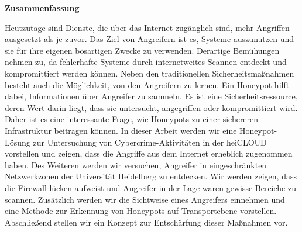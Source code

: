 \thispagestyle{empty}
\begin{center}
    \begin{minipage}[c][0.48\textheight][b]{0.9\textwidth}
        \small
        \begin{center}
            \textbf{Zusammenfassung}
        \end{center}\par
        \vspace{\baselineskip}
        Heutzutage sind Dienste, die über das Internet zugänglich sind, mehr Angriffen ausgesetzt als je zuvor.
        Das Ziel von Angreifern ist es, Systeme auszunutzen und sie für ihre eigenen bösartigen Zwecke zu verwenden.
        Derartige Bemühungen nehmen zu, da fehlerhafte Systeme durch internetweites Scannen entdeckt und kompromittiert werden können.
        Neben den traditionellen Sicherheitsmaßnahmen besteht auch die Möglichkeit, von den Angreifern zu lernen.
        Ein Honeypot hilft dabei, Informationen über Angreifer zu sammeln.
        Es ist eine Sicherheitsressource, deren Wert darin liegt, dass sie untersucht, angegriffen oder kompromittiert wird.
        Daher ist es eine interessante Frage, wie Honeypots zu einer sichereren Infrastruktur beitragen können.
        In dieser Arbeit werden wir eine Honeypot-Lösung zur Untersuchung von Cybercrime-Aktivitäten in der heiCLOUD vorstellen und zeigen, dass die Angriffe aus dem Internet erheblich zugenommen haben.
        Des Weiteren werden wir versuchen, Angreifer in eingeschränkten Netzwerkzonen der Universität Heidelberg zu entdecken.
        Wir werden zeigen, dass die Firewall lücken aufweist und Angreifer in der Lage waren gewisse Bereiche zu scannen.
        Zusätzlich werden wir die Sichtweise eines Angreifers einnehmen und eine Methode zur Erkennung von Honeypots auf Transportebene vorstellen.
        Abschließend stellen wir ein Konzept zur Entschärfung dieser Maßnahmen vor.
    \end{minipage}\par
    \vfill
\end{center}